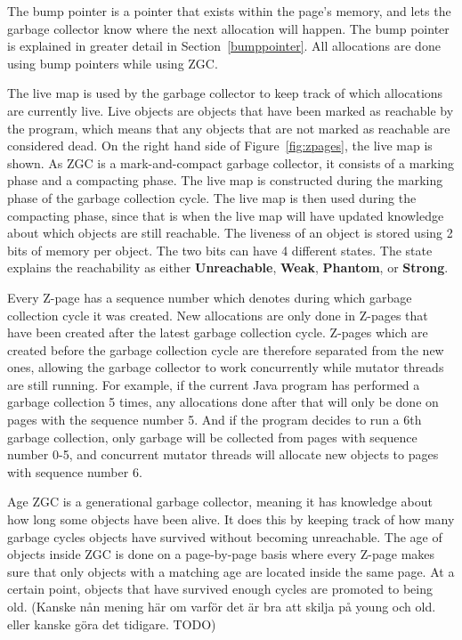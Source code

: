 \begin{description}
    \item[Bump Pointer]
        The bump pointer is a pointer that exists within the page's memory, and lets the garbage collector know where the next allocation will happen. The bump pointer is explained in greater detail in Section~\ref{bumppointer}. All allocations are done using bump pointers while using ZGC.
    \item[Live Map]
        The live map is used by the garbage collector to keep track of which allocations are currently live. Live objects are objects that have been marked as reachable by the program, which means that any objects that are not marked as reachable are considered dead. On the right hand side of Figure~\ref*{fig:zpages}, the live map is shown. As ZGC is a mark-and-compact garbage collector, it consists of a marking phase and a compacting phase. The live map is constructed during the marking phase of the garbage collection cycle. The live map is then used during the compacting phase, since that is when the live map will have updated knowledge about which objects are still reachable. The liveness of an object is stored using 2 bits of memory per object. The two bits can have 4 different states. The state explains the reachability as either \textbf{Unreachable}, \textbf{Weak}, \textbf{Phantom}, or \textbf{Strong}.
    \item[Sequence Number]
        Every Z-page has a sequence number which denotes during which garbage collection cycle it was created. New allocations are only done in Z-pages that have been created after the latest garbage collection cycle. Z-pages which are created before the garbage collection cycle are therefore separated from the new ones, allowing the garbage collector to work concurrently while mutator threads are still running. For example, if the current Java program has performed a garbage collection 5 times, any allocations done after that will only be done on pages with the sequence number 5. And if the program decides to run a 6th garbage collection, only garbage will be collected from pages with sequence number 0-5, and concurrent mutator threads will allocate new objects to pages with sequence number 6.
    \item{Age}
        ZGC is a generational garbage collector, meaning it has knowledge about how long some objects have been alive. It does this by keeping track of how many garbage cycles objects have survived without becoming unreachable. The age of objects inside ZGC is done on a page-by-page basis where every Z-page makes sure that only objects with a matching age are located inside the same page. At a certain point, objects that have survived enough cycles are promoted to being old. (Kanske nån mening här om varför det är bra att skilja på young och old. eller kanske göra det tidigare. TODO)
\end{description}


